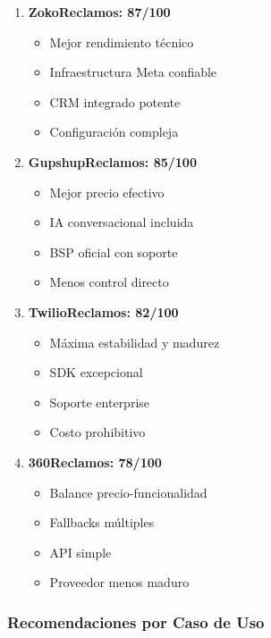\documentclass{article}
\begin{document}
\begin{enumerate}
    \item \textcolor{successgreen}{\textbf{ZokoReclamos: 87/100}}
    \begin{itemize}[label=$\bullet$]
        \item Mejor rendimiento técnico
        \item Infraestructura Meta confiable
        \item CRM integrado potente
        \item \textcolor{errorred}{Configuración compleja}
    \end{itemize}
    
    \item \textcolor{successgreen}{\textbf{GupshupReclamos: 85/100}}
    \begin{itemize}[label=$\bullet$]
        \item Mejor precio efectivo
        \item IA conversacional incluida
        \item BSP oficial con soporte
        \item \textcolor{errorred}{Menos control directo}
    \end{itemize}
    
    \item \textcolor{warningorange}{\textbf{TwilioReclamos: 82/100}}
    \begin{itemize}[label=$\bullet$]
        \item Máxima estabilidad y madurez
        \item SDK excepcional
        \item Soporte enterprise
        \item \textcolor{errorred}{Costo prohibitivo}
    \end{itemize}
    
    \item \textcolor{warningorange}{\textbf{360Reclamos: 78/100}}
    \begin{itemize}[label=$\bullet$]
        \item Balance precio-funcionalidad
        \item Fallbacks múltiples
        \item API simple
        \item \textcolor{errorred}{Proveedor menos maduro}
    \end{itemize}
\end{enumerate}

\subsubsection{Recomendaciones por Caso de Uso}
\end{document}

